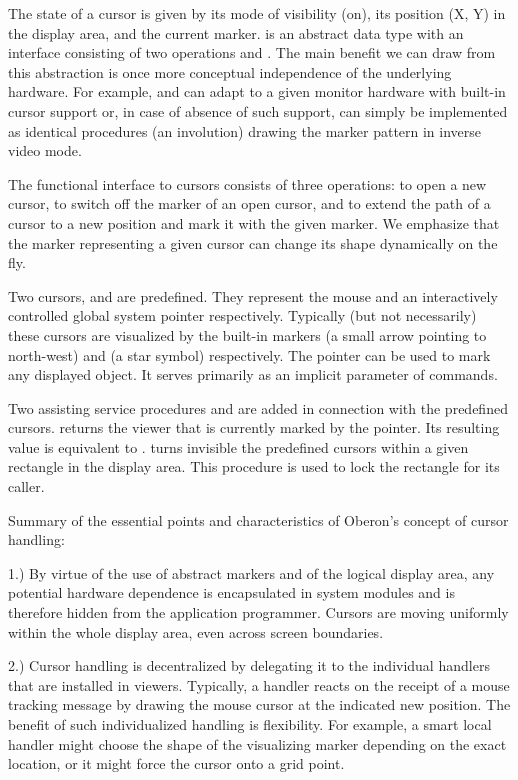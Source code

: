 \noindent The state of a cursor is given by its mode of visibility (on), its
position (X, Y) in the display area, and the current marker.  is
an abstract data type with an interface consisting of two operations
 and . The main benefit we can draw from this abstraction is
once more conceptual independence of the underlying hardware. For
example,  and  can adapt to a given monitor hardware with
built-in cursor support or, in case of absence of such support, can
simply be implemented as identical procedures (an involution) drawing
the marker pattern in inverse video mode.

The functional interface to cursors consists of three operations:
 to open a new cursor,  to switch off the marker
of an open cursor, and  to extend the path of a cursor to a
new position and mark it with the given marker. We emphasize that the
marker representing a given cursor can change its shape dynamically on
the fly.

Two cursors,  and  are predefined. They represent the
mouse and an interactively controlled global system pointer
respectively. Typically (but not necessarily) these cursors are
visualized by the built-in markers  (a small arrow pointing to
north-west) and  (a star symbol) respectively. The pointer can be
used to mark any displayed object. It serves primarily as an implicit
parameter of commands.

Two assisting service procedures  and  are
added in connection with the predefined cursors.  returns
the viewer that is currently marked by the pointer. Its resulting
value is equivalent to . 
turns invisible the predefined cursors within a given rectangle in the
display area. This procedure is used to lock the rectangle for its
caller.

Summary of the essential points and characteristics of Oberon's concept of cursor handling:

1.) By virtue of the use of abstract markers and of the logical display area, any potential hardware dependence is encapsulated in system modules and is therefore hidden from the application programmer. Cursors are moving uniformly within the whole display area, even across screen boundaries.

2.) Cursor handling is decentralized by delegating it to the individual handlers that are installed in viewers. Typically, a handler reacts on the receipt of a mouse tracking message by drawing the mouse cursor at the indicated new position. The benefit of such individualized handling is flexibility. For example, a smart local handler might choose the shape of the visualizing marker depending on the exact location, or it might force the cursor onto a grid point.

